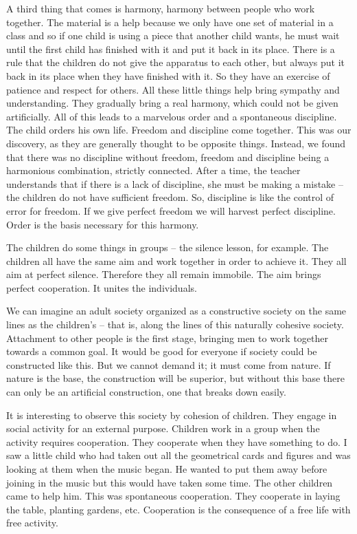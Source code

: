 \documentclass[lang=cn,10pt]{elegantbook}
\begin{document}
A third thing that comes is harmony, harmony between people who work together. The material is a help because we only have one set of material in a class and so if one child is using a piece that another child wants, he must wait until the first child has finished with it and put it back in its place. There is a rule that the children do not give the apparatus to each other, but always put it back in its place when they have finished with it. So they have an exercise of patience and respect for others. All these little things help bring sympathy and understanding. They gradually bring a real harmony, which could not be given artificially. All of this leads to a marvelous order and a spontaneous discipline. The child orders his own life. Freedom and discipline come together. This was our discovery, as they are generally thought to be opposite things. Instead, we found that there was no discipline without freedom, freedom and discipline being a harmonious combination, strictly connected. After a time, the teacher understands that if there is a lack of discipline, she must be making a mistake – the children do not have sufficient freedom. So, discipline is like the control of error for freedom. If we give perfect freedom we will harvest perfect discipline. Order is the basis necessary for this harmony.

The children do some things in groups – the silence lesson, for example. The children all have the same aim and work together in order to achieve it. They all aim at perfect silence. Therefore they all remain immobile. The aim brings perfect cooperation. It unites the individuals.

We can imagine an adult society organized as a constructive society on the same lines as the children’s – that is, along the lines of this naturally cohesive society. Attachment to other people is the first stage, bringing men to work together towards a common goal. It would be good for everyone if society could be constructed like this. But we cannot demand it; it must come from nature. If nature is the base, the construction will be superior, but without this base there can only be an artificial construction, one that breaks down easily.

It is interesting to observe this society by cohesion of children. They engage in social activity for an external purpose. Children work in a group when the activity requires cooperation. They cooperate when they have something to do. I saw a little child who had taken out all the geometrical cards and figures and was looking at them when the music began. He wanted to put them away before joining in the music but this would have taken some time. The other children came to help him. This was spontaneous cooperation. They cooperate in laying the table, planting gardens, etc. Cooperation is the consequence of a free life with free activity.
\end{document}
